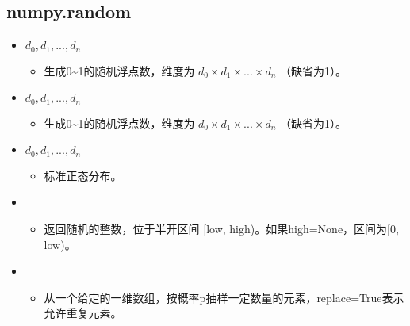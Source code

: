 \documentclass[letterpaper,10pt,english]{sphinxmanual}
\begin{document}
\subsection{numpy.random}
\label{\detokenize{python/09_random:numpy-random}}
%
\begin{sphinxVerbatim}[commandchars=\\\{\}]
   
\end{sphinxVerbatim}
\begin{itemize}
\item {} 
\sphinxstylestrong{numpy.random.random({[}} \(d_0, d_1, ... ,d_n\) \sphinxstylestrong{{]})}
\begin{itemize}
\item {} 
生成0\textasciitilde{}1的随机浮点数，维度为 \(d_0 \times d_1 \times ... \times d_n\) （缺省为1）。

\end{itemize}

\item {} 
 \(d_0, d_1, ... ,d_n\) \sphinxstylestrong{)}
\begin{itemize}
\item {} 
生成0\textasciitilde{}1的随机浮点数，维度为 \(d_0 \times d_1 \times ... \times d_n\) （缺省为1）。

\end{itemize}

\item {} 
 \(d_0, d_1, ... ,d_n\) \sphinxstylestrong{)}
\begin{itemize}
\item {} 
标准正态分布。

\end{itemize}

\item {} 
\begin{itemize}
\item {} 
返回随机的整数，位于半开区间 {[}low, high)。如果high=None，区间为{[}0, low)。

\end{itemize}

\item {} 
\begin{itemize}
\item {} 
从一个给定的一维数组，按概率p抽样一定数量的元素，replace=True表示允许重复元素。


\end{itemize}
\end{itemize}
\end{document}
